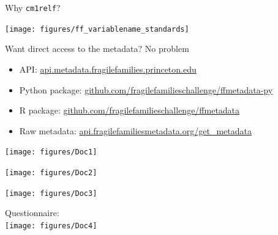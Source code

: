 \documentclass{beamer}
\begin{document}
\begin{frame}

Why \texttt{cm1relf}? \pause

\begin{center}
\texttt{[image: figures/ff\_variablename\_standards]}
\end{center}

\end{frame}
\begin{frame}

Want direct access to the metadata?  \pause No problem

\begin{itemize}
\item API: \url{api.metadata.fragilefamilies.princeton.edu}
\item Python package: \url{github.com/fragilefamilieschallenge/ffmetadata-py}
\item R package: \url{github.com/fragilefamilieschallenge/ffmetadata}
\item Raw metadata: \url{api.fragilefamiliesmetadata.org/get_metadata}
\end{itemize}

\end{frame}
\begin{frame}

\centering\texttt{[image: figures/Doc1]}

\end{frame}
\begin{frame}

\centering\texttt{[image: figures/Doc2]}

\end{frame}
\begin{frame}

\centering\texttt{[image: figures/Doc3]}

\end{frame}
\begin{frame}

Questionnaire:\\
\centering\texttt{[image: figures/Doc4]}

\end{frame}

\end{document}
